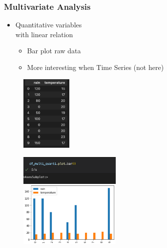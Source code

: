 \begin{frame}\frametitle{Multivariate Analysis}
   \begin{minipage}{0.48\linewidth}
      \begin{itemize}
         \item Quantitative variables\\
               with linear relation
         \begin{itemize}
            \item Bar plot raw data
            \item More interesting when Time Series (not here)
         \end{itemize}
      \end{itemize}
      \vspace{.5cm}
      \begin{figure}[H]
         \includegraphics[width=2.5cm]{../images/illustrations/pattern_multivariate_quantitative_df.png}
      \end{figure}
   \end{minipage}
   \begin{minipage}{0.48\linewidth}
      \begin{figure}[H]
         \includegraphics[width=5cm]{../images/illustrations/pattern_multivariate_quantitative_bar_raw_data.png}
      \end{figure}
   \end{minipage}
\end{frame}


